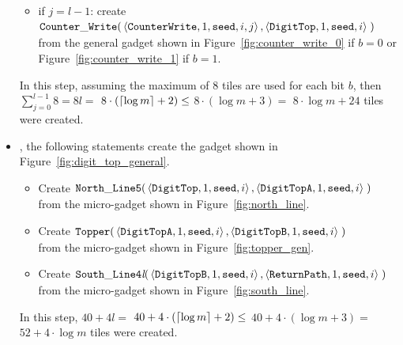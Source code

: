 \begin{itemize}
\begin{itemize}
        \item if $j = l-1$: create
        $\begin{aligned}[t]
            \cwrite(&\left\langle {\tt CounterWrite}, 1, {\tt seed}, i, j \right\rangle, \left\langle {\tt DigitTop}, 1, {\tt seed}, i \right\rangle \;)
        \end{aligned}$\\from the general gadget shown in Figure~\ref{fig:counter_write_0} if $b = 0$ or Figure~\ref{fig:counter_write_1} if $b = 1$.
    \end{itemize}
    In this step, assuming the maximum of 8 tiles are used for each bit $b$, then
    $\sum^{l-1}_{j=0} 8 = 8l =$
    $8 \cdot \left( \ceil*{\log m} + 2 \right) \leq$
    $8 \cdot \left( {\log m} + 3 \right) =$
    $8 \cdot {\log m} + 24$ tiles were created.

    \item {\dtop}, the following statements create the gadget shown in Figure~\ref{fig:digit_top_general}.
    \begin{itemize}
        \item Create
        $\begin{aligned}[t]
            {\tt North\_Line5}(& \left \langle {\tt DigitTop},  1, {\tt seed}, i \right\rangle,
                                 \left \langle {\tt DigitTopA}, 1, {\tt seed}, i \right\rangle \;)
        \end{aligned}$\\ from the micro-gadget shown in Figure~\ref{fig:north_line}.

        \item Create
        $\begin{aligned}[t]
            {\tt Topper}(& \left\langle {\tt DigitTopA}, 1, {\tt seed}, i \right\rangle,
                           \left\langle {\tt DigitTopB}, 1, {\tt seed}, i \right\rangle \;)
        \end{aligned}$\\ from the micro-gadget shown in Figure~\ref{fig:topper_gen}.

        \item Create
        $\begin{aligned}[t]
            {\tt South\_Line4\textit{l}}(& \left\langle {\tt DigitTopB},  1, {\tt seed}, i\right\rangle,
                                           \left\langle {\tt ReturnPath}, 1, {\tt seed}, i\right\rangle \;)
        \end{aligned}$\\ from the micro-gadget shown in Figure~\ref{fig:south_line}.
    \end{itemize}
    In this step, $40 + 4l =$
    $40 + 4 \cdot \left( \ceil*{\log m} + 2 \right) \leq$
    $40 + 4 \cdot \left( {\log m} + 3 \right) =$
    $52 + 4 \cdot {\log m}$ tiles were created.


\end{itemize}
